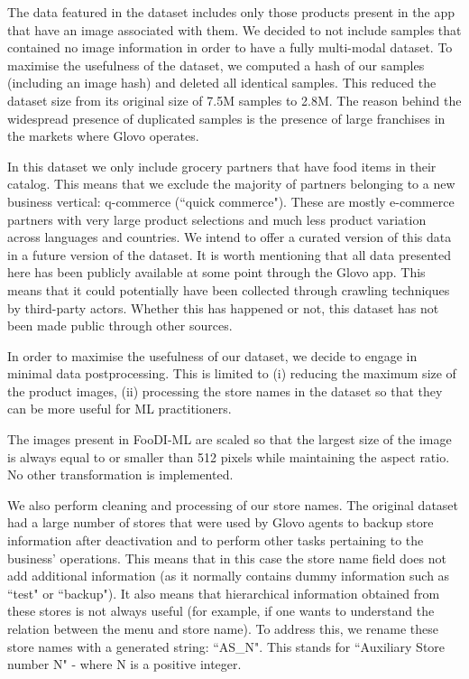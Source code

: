 \documentclass[10pt,twocolumn,letterpaper]{article}
\begin{document}
The data featured in the dataset includes only those products present in the app that have an image associated with them. We decided to not include samples that contained no image information in order to have a fully multi-modal dataset. To maximise the usefulness of the dataset, we computed a hash of our samples (including an image hash) and deleted all identical samples. This reduced the dataset size from its original size of 7.5M samples to 2.8M. The reason behind the widespread presence of duplicated samples is the presence of large franchises in the markets where Glovo operates.

In this dataset we only include grocery partners that have food items in their catalog. This means that we exclude the majority of partners belonging to a new business vertical: q-commerce (``quick commerce"). These are mostly e-commerce partners with very large product selections and much less product variation across languages and countries. We intend to offer a curated version of this data in a future version of the dataset. It is worth mentioning that all data presented here has been publicly available at some point through the Glovo app. This means that it could potentially have been collected through crawling techniques by third-party actors. Whether this has happened or not, this dataset has not been made public through other sources.

In order to maximise the usefulness of our dataset, we decide to engage in minimal data postprocessing. This is limited to (i) reducing the maximum size of the product images, (ii) processing the store names in the dataset so that they can be more useful for ML practitioners. 

The images present in FooDI-ML are scaled so that the largest size of the image is always equal to or smaller than 512 pixels while maintaining the aspect ratio. No other transformation is implemented.

We also perform cleaning and processing of our store names. The original dataset had a large number of stores that were used by Glovo agents to backup store information after deactivation and to perform other tasks pertaining to the business' operations. This means that in this case the store name field does not add additional information (as it normally contains dummy information such as ``test" or ``backup"). It also means that hierarchical information obtained from these stores is not always useful (for example, if one wants to understand the relation between the menu and store name). To address this, we rename these store names with a generated string: ``AS\_N". This stands for ``Auxiliary Store number N" - where N is a positive integer.
\end{document}
